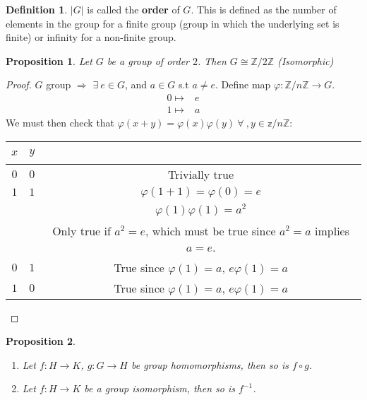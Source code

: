 \documentclass{article}
\newtheorem{theorem}{Proposition}[section]
\theoremstyle{definition}
\newtheorem{definition}{Definition}[section]
\theoremstyle{remark}
\begin{document}
\begin{definition}
	$|G|$ is called the \textbf{order} of $G$. This is defined as the number of elements in the group for a finite group (group in which the underlying set is finite) or infinity for a non-finite group.\\
\end{definition}
\begin{theorem}
	Let $G$ be a group of order $2$. Then $G\cong \mathbb{Z}/2\mathbb{Z}$ (Isomorphic)
\end{theorem}
\begin{proof}
	$G$ group $\Rightarrow$ $\exists~e\in G$, and $ a\in G$ s.t $a\neq e$. Define map $\varphi:\mathbb{Z}/n\mathbb{Z}\rightarrow G$.
	\begin{align*}
		0\mapsto & e \\
		1\mapsto & a
	\end{align*}
	We must then check that $\varphi(x+y)=\varphi(x)\varphi(y)~\forall~,y\in \mathbb{z}/n\mathbb{Z}$:\\
	\begin{center}
		\begin{tabular}{c|c|c}
			$x$ & $y$ & ~                                                                     \\
			\hline
			$0$ & $0$ & Trivially true                                                        \\
			\hline
			$1$ & $1$ & $\varphi(1+1)=\varphi(0)=e$                                           \\
			~   & ~   & $\varphi (1)\varphi(1)=a^2$                                           \\
			~   & ~   & Only true if $a^2=e$, which must be true since $a^2=a$ implies $a=e$. \\
			\hline
			$0$ & $1$ & True since $\varphi(1)=a$, $e\varphi(1)=a$                            \\
			\hline
			$1$ & $0$ & True since $\varphi(1)=a$, $e\varphi(1)=a$                            \\
		\end{tabular}
	\end{center}
\end{proof}
\begin{theorem}~
	\begin{enumerate}
		\item Let $f:H\rightarrow K$, $g:G\rightarrow H$ be group homomorphisms, then so is $f\circ g$.
		\item Let $f:H\rightarrow K$ be a group isomorphism, then so is $f^{-1}$.
	\end{enumerate}
\end{theorem}
\end{document}
